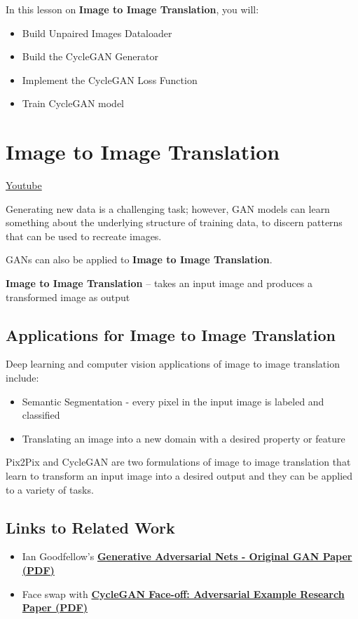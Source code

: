 In this lesson on \textbf{Image to Image Translation}, you will:

\begin{itemize}
    \item Build Unpaired Images Dataloader
    \item Build the CycleGAN Generator
    \item Implement the CycleGAN Loss Function
    \item Train CycleGAN model
\end{itemize}
\section{Image to Image Translation}
\href{https://www.youtube.com/watch?v=f-WnvKQd10k}{Youtube} \newline

Generating new data is a challenging task; however, GAN models can learn something about the underlying structure of training data, to discern patterns that can be used to recreate images.\newline

GANs can also be applied to \textbf{Image to Image Translation}.

\textbf{Image to Image Translation} – takes an input image and produces a transformed image as output
\subsection{Applications for Image to Image Translation}
Deep learning and computer vision applications of image to image translation include:
\begin{itemize}
    \item Semantic Segmentation - every pixel in the input image is labeled and classified
    \item Translating an image into a new domain with a desired property or feature
\end{itemize}
Pix2Pix and CycleGAN are two formulations of image to image translation that learn to transform an input image into a desired output and they can be applied to a variety of tasks.

\subsection{Links to Related Work}
\begin{itemize}
    \item Ian Goodfellow's \href{http://papers.nips.cc/paper/5423-generative-adversarial-nets.pdf}{\textbf{Generative Adversarial Nets - Original GAN Paper (PDF)}}
    \item Face swap with \href{https://arxiv.org/pdf/1712.03451.pdf}{\textbf{CycleGAN Face-off: Adversarial Example Research Paper (PDF)}}
\end{itemize}

